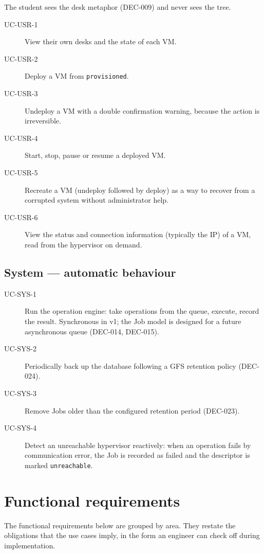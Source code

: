 The student sees the desk metaphor (DEC-009) and never sees the
tree.

\begin{description}
  \item[UC-USR-1] View their own desks and the state of each VM.
  \item[UC-USR-2] Deploy a VM from \texttt{provisioned}.
  \item[UC-USR-3] Undeploy a VM with a double confirmation warning,
        because the action is irreversible.
  \item[UC-USR-4] Start, stop, pause or resume a deployed VM.
  \item[UC-USR-5] Recreate a VM (undeploy followed by deploy) as
        a way to recover from a corrupted system without
        administrator help.
  \item[UC-USR-6] View the status and connection information
        (typically the IP) of a VM, read from the hypervisor on
        demand.
\end{description}

\subsection{System --- automatic behaviour}

\begin{description}
  \item[UC-SYS-1] Run the operation engine: take operations from
        the queue, execute, record the result. Synchronous in v1;
        the Job model is designed for a future asynchronous queue
        (DEC-014, DEC-015).
  \item[UC-SYS-2] Periodically back up the database following a GFS
        retention policy (DEC-024).
  \item[UC-SYS-3] Remove Jobs older than the configured retention
        period (DEC-023).
  \item[UC-SYS-4] Detect an unreachable hypervisor reactively:
        when an operation fails by communication error, the Job is
        recorded as failed and the descriptor is marked
        \texttt{unreachable}.
\end{description}

\section{Functional requirements}

The functional requirements below are grouped by area. They restate
the obligations that the use cases imply, in the form an engineer
can check off during implementation.

